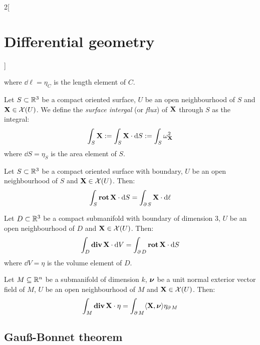 \documentclass[../../../main.tex]{subfiles}
\begin{document}
\begin{multicols}{2}[\section{Differential geometry}]
\begin{definition}
    where $\dd{\ell}=\eta_C$ is the length element of $C$.
  \end{definition}
  \begin{definition}
    Let $S\subset\mathbb{R}^3$ be a compact oriented surface, $U$ be an open neighbourhood of $S$ and $\boldsymbol{\mathrm{X}}\in\mathcal{X}(U)$. We define the \emph{surface intergal} (or \emph{flux}) of $\boldsymbol{\mathrm{X}}$ through $S$ as the integral: $$\int_S\boldsymbol{\mathrm{X}}:=\int_S\boldsymbol{\mathrm{X}}\cdot\dd{S}:=\int_S\omega_{\boldsymbol{\mathrm{X}}}^2$$
    where $\dd{S}=\eta_S$ is the area element of $S$.
  \end{definition}
  \begin{theorem}
    Let $S\subset\mathbb{R}^3$ be a compact oriented surface with boundary, $U$ be an open neighbourhood of $S$ and $\boldsymbol{\mathrm{X}}\in\mathcal{X}(U)$. Then: $$\int_S\operatorname{\boldsymbol{\mathrm{rot}}}{\boldsymbol{\mathrm{X}}}\cdot\dd{S}=\int_{\operatorname{\partial}{S}}\boldsymbol{\mathrm{X}}\cdot\dd{\ell}$$
  \end{theorem}
  \begin{theorem}
    Let $D\subset\mathbb{R}^3$ be a compact submanifold with boundary of dimension 3, $U$ be an open neighbourhood of $D$ and $\boldsymbol{\mathrm{X}}\in\mathcal{X}(U)$. Then: $$\int_D\operatorname{\boldsymbol{\mathrm{div}}}{\boldsymbol{\mathrm{X}}}\cdot\dd{V}=\int_{\operatorname{\partial}{D}}\operatorname{\boldsymbol{\mathrm{rot}}}{\boldsymbol{\mathrm{X}}}\cdot\dd{S}$$
    where $\dd{V}=\eta$ is the volume element of $D$.
  \end{theorem}
  \begin{theorem}
    Let $M\subseteq\mathbb{R}^n$ be a submanifold of dimension $k$, $\boldsymbol{\mathrm{\nu}}$ be a unit normal exterior vector field of $M$, $U$ be an open neighbourhood of $M$ and $\boldsymbol{\mathrm{X}}\in\mathcal{X}(U)$. Then: $$\int_M\operatorname{\boldsymbol{\mathrm{div}}}{\boldsymbol{\mathrm{X}}}\cdot\eta=\int_{\operatorname{\partial}{M}}\langle\boldsymbol{\mathrm{X}},\boldsymbol{\mathrm{\nu}}\rangle\eta_{\operatorname{\partial}{M}}$$
  \end{theorem}
  \subsection{Gau\ss-Bonnet theorem}

\end{multicols}
\end{document}
